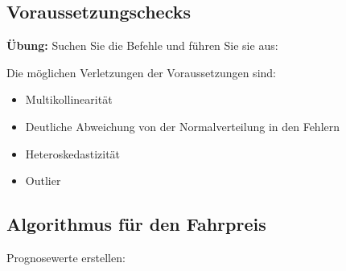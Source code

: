 \documentclass[
  10pt,
  letterpaper,
  a4paper, twoside]{scrreprt}
\providecommand{\tightlist}{%
  \setlength{\itemsep}{0pt}\setlength{\parskip}{0pt}}\usepackage{longtable,booktabs,array}
\begin{document}
\subsection*{Voraussetzungschecks}\label{voraussetzungschecks-2}

\textbf{Übung:} Suchen Sie die Befehle und führen Sie sie aus:

Die möglichen Verletzungen der Voraussetzungen sind:

\begin{itemize}
\tightlist
\item
  Multikollinearität
\item
  Deutliche Abweichung von der Normalverteilung in den Fehlern
\item
  Heteroskedastizität
\item
  Outlier
\end{itemize}

\subsection*{Algorithmus für den
Fahrpreis}\label{algorithmus-fuxfcr-den-fahrpreis-1}

Prognosewerte erstellen:
\end{document}
